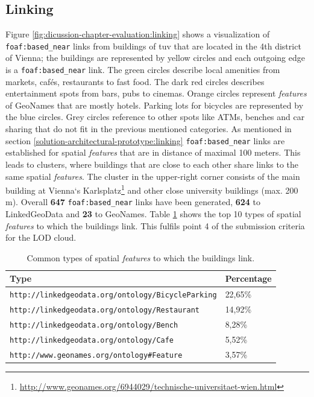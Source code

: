 \documentclass[draft,final]{vutinfth} %
\begin{document}
\subsection{Linking}
\label{dicussion-chapter-evaluation:linking}
Figure \ref{fig:dicussion-chapter-evaluation:linking} shows a visualization of \texttt{foaf:based\_near} links from buildings of \gls{tuv} that are located in the 4th district of Vienna; the buildings are represented by yellow circles and each outgoing edge is a \texttt{foaf:based\_near} link. The green circles describe local amenities from markets, cafés, restaurants to fast food. The dark red circles describes entertainment spots from bars, pubs to cinemas. Orange circles represent \textit{features} of GeoNames that are mostly hotels. Parking lots for bicycles are represented by the blue circles. Grey circles reference to other spots like ATMs, benches and car sharing that do not fit in the previous mentioned categories. As mentioned in section \ref{solution-architectural-prototype:linking} \texttt{foaf:based\_near} links are established for spatial \textit{features} that are in distance of maximal 100 meters. This leads to clusters, where buildings that are close to each other share links to the same spatial \textit{features}. The cluster in the upper-right corner consists of the main building at Vienna`s Karlsplatz\footnote{\url{http://www.geonames.org/6944029/technische-universitaet-wien.html}} and other close university buildings (max. 200 m). Overall \textbf{647} \texttt{foaf:based\_near} links have been generated, \textbf{624} to LinkedGeoData and \textbf{23} to GeoNames. Table \ref{tab:dicussion-chapter-evaluation:linking} shows the top 10 types of spatial \textit{features} to which the buildings link. This fulfils point 4 of the submission criteria for the LOD cloud.

\begin{table}
  \centering
  \begin{tabular}{| l | l |}
    \hline
       Type & Percentage \\ \hline
       \texttt{http://linkedgeodata.org/ontology/BicycleParking} & 22,65\% \\ \hline
       \texttt{http://linkedgeodata.org/ontology/Restaurant} & 14,92\% \\ \hline
       \texttt{http://linkedgeodata.org/ontology/Bench} & 8,28\% \\ \hline
       \texttt{http://linkedgeodata.org/ontology/Cafe} & 5,52\% \\ \hline
       \texttt{http://www.geonames.org/ontology\#Feature} & 3,57\% \\ \hline
  \end{tabular}
  \caption{Common types of spatial \textit{features} to which the buildings link.}
  \label{tab:dicussion-chapter-evaluation:linking}
\end{table}
\end{document}
